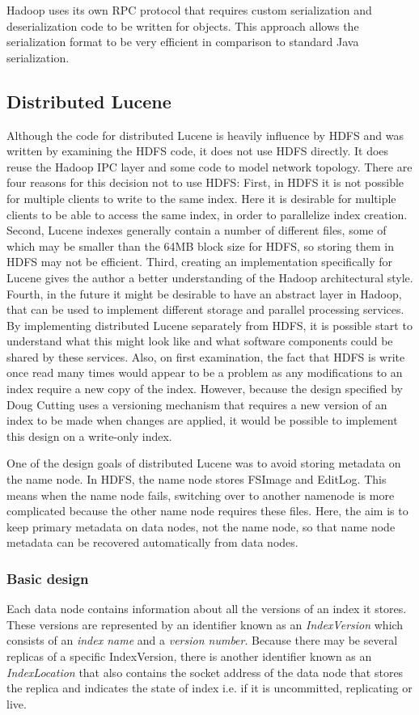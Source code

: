 \documentclass[a4paper,10pt]{article}
\begin{document}
Hadoop uses its own RPC protocol that requires custom serialization and deserialization code to be written for objects. This approach allows the serialization format to be very efficient in comparison to standard Java serialization. 

\subsection{Distributed Lucene}
Although the code for distributed Lucene is heavily influence by HDFS and was written by examining the HDFS code, it does not use HDFS directly. It does reuse the Hadoop IPC layer and some code to model network topology. There are four reasons for this decision not to use HDFS: First, in HDFS it is not possible for multiple clients to write to the same index. Here it is desirable for multiple clients to be able to access the same index, in order to parallelize index creation. Second, Lucene indexes generally contain a number of different files, some of which may be smaller than the 64MB block size for HDFS, so storing them in HDFS may not be efficient. Third, creating an implementation specifically for Lucene gives the author a better understanding of the Hadoop architectural style. Fourth, in the future it might be desirable to have an abstract layer in Hadoop, that can be used to implement different storage and parallel processing services. By implementing distributed Lucene separately from HDFS, it is possible start to understand what this might look like and what software components could be shared by these services. Also, on first examination, the fact that HDFS is write once read many times would appear to be a problem as any modifications to an index require a new copy of the index. However, because the design specified by Doug Cutting \cite{cutting2006} uses a versioning mechanism that requires a new version of an index to be made when changes are applied, it would be possible to implement this design on a write-only index. 

One of the design goals of distributed Lucene was to avoid storing metadata on the name node. In HDFS, the name node stores FSImage and EditLog. This means when the name node fails, switching over to another namenode is more complicated because the other name node requires these files. Here, the aim is to keep primary metadata on data nodes, not the name node, so that name node metadata can be recovered automatically from data nodes. 

\subsubsection{Basic design}
Each data node contains information about all the versions of an index it stores. These versions are represented by an identifier known as an \emph{IndexVersion} which consists of an \emph{index name} and a \emph{version number}. Because there may be several replicas of a specific IndexVersion, there is another identifier known as an \emph{IndexLocation} that also contains the socket address of the data node that stores the replica and indicates the state of index i.e. if it is uncommitted, replicating or live. 
\end{document}

